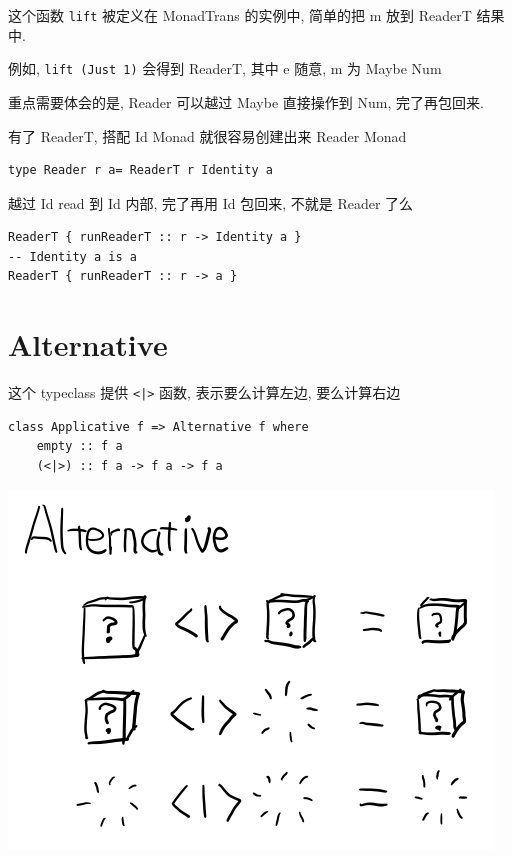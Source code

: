 \documentclass[letterspacing]{tufte-book}
\begin{document}
这个函数 \texttt{lift} 被定义在 MonadTrans 的实例中, 简单的把 m 放到 ReaderT 结果中.

例如, \texttt{lift (Just 1)} 会得到 ReaderT, 其中 e 随意, m 为 Maybe Num

重点需要体会的是, Reader 可以越过 Maybe 直接操作到 Num, 完了再包回来.

有了 ReaderT, 搭配 Id Monad 就很容易创建出来 Reader Monad

\lstset{language=haskell,label= ,caption= ,captionpos=b,numbers=none}
\begin{lstlisting}
type Reader r a= ReaderT r Identity a
\end{lstlisting}

越过 Id read 到 Id 内部, 完了再用 Id 包回来, 不就是 Reader 了么

\lstset{language=haskell,label= ,caption= ,captionpos=b,numbers=none}
\begin{lstlisting}
ReaderT { runReaderT :: r -> Identity a }
-- Identity a is a
ReaderT { runReaderT :: r -> a }
\end{lstlisting}

\chapter{Alternative}
\label{sec:org4cd6769}

这个 typeclass 提供 \texttt{<|>} 函数, 表示要么计算左边, 要么计算右边

\lstset{language=haskell,label= ,caption= ,captionpos=b,numbers=none}
\begin{lstlisting}
class Applicative f => Alternative f where
    empty :: f a
    (<|>) :: f a -> f a -> f a
\end{lstlisting}

\begin{center}
\includegraphics[width=.9\linewidth]{images/p3-Alternative.png}
\end{center}
\end{document}
